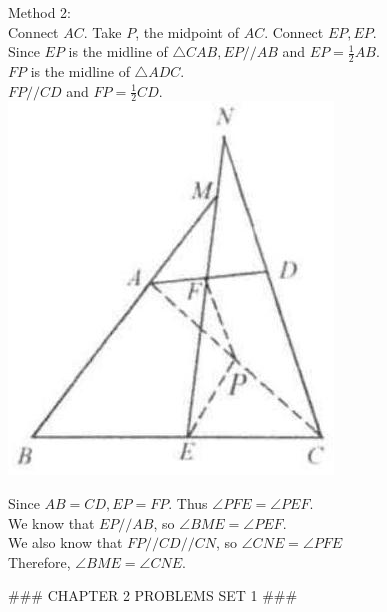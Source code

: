 \documentclass[10pt]{article}
\begin{document}
Method 2:\\
Connect \(A C\). Take \(P\), the midpoint of \(A C\). Connect \(E P, E P\).\\
Since \(E P\) is the midline of \(\triangle C A B, E P / / A B\) and \(E P=\frac{1}{2} A B\).\\
\(F P\) is the midline of \(\triangle A D C\).\\
\(F P / / C D\) and \(F P=\frac{1}{2} C D\).\\
\includegraphics[max width=\textwidth, center]{2025_04_17_97bc1f7e44d93c271a88g-043}

Since \(A B=C D, E P=F P\). Thus \(\angle P F E=\angle P E F\).\\
We know that \(E P / / A B\), so \(\angle B M E=\angle P E F\).\\
We also know that \(F P / / C D / / C N\), so \(\angle C N E=\angle P F E\)\\
Therefore, \(\angle B M E=\angle C N E\).


### CHAPTER 2 PROBLEMS SET 1 ###
\end{document}
